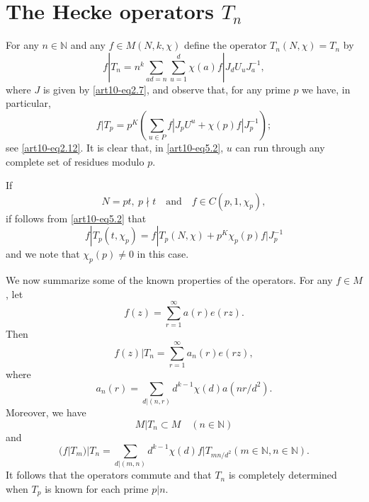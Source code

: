 \section{The Hecke operators $T_{n}$}\label{art10-sec5}
For any $n\in \mathbb{N}$ and any $f\in M(N,k,\chi)$ define the operator $T_{n}(N,\chi)=T_{n}$ by
\setcounter{equation}{0}
\begin{equation}
f|T_{n}=n^{k}\sum\limits_{ad=n}\sum\limits^{d}_{u=1}\chi(a)f|J_{d}U_{u}J^{-1}_{a},\label{art10-eq5.1}
\end{equation}
where $J$ is given by \eqref{art10-eq2.7}, and observe that, for any prime $p$ we have, in particular,
\begin{equation}
f|T_{p}=p^{K}\left(\sum\limits_{u\in P}f|J_{p}U^{u}+\chi(p)f|J^{-1}_{p}\right);\label{art10-eq5.2}
\end{equation}
see \eqref{art10-eq2.12}. It is clear that, in \eqref{art10-eq5.2}, $u$ can run through any complete set of residues modulo $p$.

If
\begin{equation}
N=pt, \ p\nmid t\text{~~ and~~ } f\in C(p,1,\chi_{p}),\label{art10-eq5.3}
\end{equation}
if follows from \eqref{art10-eq5.2} that
\begin{equation}
f|T_{p}(t,\chi_{p})=f|T_{p}(N,\chi)+p^{K}\chi_{p}(p)f|J^{-1}_{p}\label{art10-eq5.4}
\end{equation}
and we note that $\chi_{p}(p)\neq 0$ in this case.

We now summarize some of the known properties of the operators. For any $f\in M$, let 
\begin{equation}
f(z)=\sum\limits^{\infty}_{r=1}a(r)e(rz).\label{art10-eq5.5}
\end{equation}
Then\pageoriginale
\begin{equation}
f(z)|T_{n}=\sum\limits^{\infty}_{r=1}a_{n}(r)e(rz),\label{art10-eq5.6}
\end{equation}
where 
\begin{equation}
a_{n}(r)=\sum\limits_{d|(n,r)}d^{k-1}\chi(d)a(nr/d^{2}).\label{art10-eq5.7}
\end{equation}
Moreover, we have
\begin{equation}
M|T_{n}\subset M\quad (n\in \mathbb{N})\label{art10-eq5.8}
\end{equation}
and
\begin{equation}
(f|T_{m})|T_{n}=\sum\limits_{d|(m,n)}d^{k-1}\chi(d)f|T_{mn/d^{2}}(m\in \mathbb{N},n\in \mathbb{N}).\label{art10-eq5.9}
\end{equation}
It follows that the operators commute and that $T_{n}$ is completely determined when $T_{p}$ is known for each prime $p|n$.


